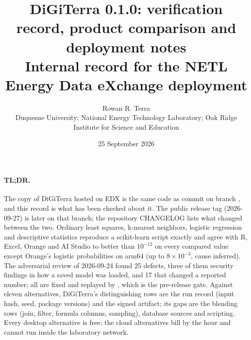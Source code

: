 \newcommand{\DocFooter}{DiGiTerra 0.1.0 verification record for the EDX deployment, 2026-09-25, affiliation corrected 2026-10-03}

\title{DiGiTerra 0.1.0: verification record, product comparison and deployment notes\\[4pt]\large Internal record for the NETL Energy Data eXchange deployment}
\author{Rowan R. Terra\\[2pt]\normalsize Duquesne University; National Energy Technology Laboratory; Oak Ridge Institute for Science and Education}
\date{25 September 2026}

\maketitle

\paragraph{TL;DR.} The copy of DiGiTerra hosted on EDX is the same code as commit  on branch , and this record is what has been checked about it. The public release tag  (2026-09-27) is later on that branch; the repository CHANGELOG lists what changed between the two. Ordinary least squares, k-nearest neighbors, logistic regression and descriptive statistics reproduce a scikit-learn script exactly and agree with R, Excel, Orange and AI Studio to better than $10^{-12}$ on every compared value except Orange's logistic probabilities on arm64 (up to $8\times10^{-3}$, cause inferred). The adversarial review of 2026-09-24 found 25 defects, three of them security findings in how a saved model was loaded, and 17 that changed a reported number; all are fixed and replayed by , which is the pre-release gate. Against eleven alternatives, DiGiTerra's distinguishing rows are the run record (input hash, seed, package versions) and the signed artifact; its gaps are the blending rows (join, filter, formula columns, sampling), database sources and scripting. Every desktop alternative is free; the cloud alternatives bill by the hour and cannot run inside the laboratory network.

\tableofcontents



